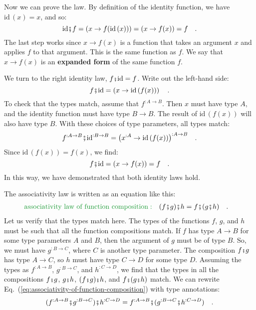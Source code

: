 Now we can prove the law. By definition of the identity function,
we have $\text{id}\,(x)=x$, and so:
\[
\text{id}\bef f=\left(x\rightarrow f(\text{id}\,(x))\right)=\left(x\rightarrow f(x)\right)=f\quad.
\]
The last step works since $x\rightarrow f(x)$ is a function that
takes an argument $x$ and applies $f$ to that argument. This is
the same function as $f$. We say that $x\rightarrow f(x)$ is an
\textbf{expanded form} of the
same function $f$.

We turn to the right identity law, $f\bef\text{id}=f$. Write out
the left-hand side:
\[
f\bef\text{id}=\left(x\rightarrow\text{id}\,(f(x))\right)\quad.
\]
To check that the types match, assume that $f^{:A\rightarrow B}$.
Then $x$ must have type $A$, and the identity function must have
type $B\rightarrow B$. The result of $\text{id}\,(f(x))$ will also
have type $B$. With these choices of type parameters, all types match:
\[
f^{:A\rightarrow B}\bef\text{id}^{:B\rightarrow B}=\big(x^{:A}\rightarrow\text{id}\,(f(x))\big)^{:A\rightarrow B}\quad.
\]
Since $\text{id}\,(f(x))=f(x)$, we find:
\[
f\bef\text{id}=\left(x\rightarrow f(x)\right)=f\quad.
\]
In this way, we have demonstrated that both identity laws hold. 

The associativity law is written as an equation like this:
\begin{align}
{\color{greenunder}\text{associativity law of function composition}:}\quad & (f\bef g)\bef h=f\bef(g\bef h)\quad.\label{eq:associativity-of-function-composition}
\end{align}
Let us verify that the types match here. The types of the functions
$f$, $g$, and $h$ must be such that all the function compositions
match. If $f$ has type $A\rightarrow B$ for some type parameters
$A$ and $B$, then the argument of $g$ must be of type $B$. So,
we must have $g^{:B\rightarrow C}$, where $C$ is another type parameter.
The composition $f\bef g$ has type $A\rightarrow C$, so $h$ must
have type $C\rightarrow D$ for some type $D$. Assuming the types
as $f^{:A\rightarrow B}$, $g^{:B\rightarrow C}$, and $h^{:C\rightarrow D}$,
we find that the types in all the compositions $f\bef g$, $g\bef h$,
$(f\bef g)\bef h$, and $f\bef(g\bef h)$ match. We can rewrite Eq.~(\ref{eq:associativity-of-function-composition})
with type annotations: 
\begin{equation}
(f^{:A\rightarrow B}\bef g^{:B\rightarrow C})\bef h^{:C\rightarrow D}=f^{:A\rightarrow B}\bef(g^{:B\rightarrow C}\bef h^{:C\rightarrow D})\quad.\label{eq:associativity-law-for-function-composition-with-types}
\end{equation}

